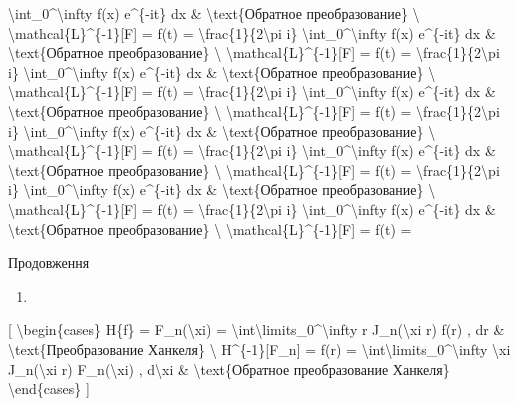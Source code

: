 \documentclass[
]{article}
\providecommand{\tightlist}{%
  \setlength{\itemsep}{0pt}\setlength{\parskip}{0pt}}
\begin{document}
\begin{enumerate}
  \textbackslash int\_0\^{}\textbackslash infty f(x) e\^{}\{-it\} dx \&
  \textbackslash text\{Обратное преобразование\} \textbackslash{}
  \textbackslash mathcal\{L\}\^{}\{-1\}{[}F{]} = f(t) =
  \textbackslash frac\{1\}\{2\textbackslash pi i\}
  \textbackslash int\_0\^{}\textbackslash infty f(x) e\^{}\{-it\} dx \&
  \textbackslash text\{Обратное преобразование\} \textbackslash{}
  \textbackslash mathcal\{L\}\^{}\{-1\}{[}F{]} = f(t) =
  \textbackslash frac\{1\}\{2\textbackslash pi i\}
  \textbackslash int\_0\^{}\textbackslash infty f(x) e\^{}\{-it\} dx \&
  \textbackslash text\{Обратное преобразование\} \textbackslash{}
  \textbackslash mathcal\{L\}\^{}\{-1\}{[}F{]} = f(t) =
  \textbackslash frac\{1\}\{2\textbackslash pi i\}
  \textbackslash int\_0\^{}\textbackslash infty f(x) e\^{}\{-it\} dx \&
  \textbackslash text\{Обратное преобразование\} \textbackslash{}
  \textbackslash mathcal\{L\}\^{}\{-1\}{[}F{]} = f(t) =
  \textbackslash frac\{1\}\{2\textbackslash pi i\}
  \textbackslash int\_0\^{}\textbackslash infty f(x) e\^{}\{-it\} dx \&
  \textbackslash text\{Обратное преобразование\} \textbackslash{}
  \textbackslash mathcal\{L\}\^{}\{-1\}{[}F{]} = f(t) =
  \textbackslash frac\{1\}\{2\textbackslash pi i\}
  \textbackslash int\_0\^{}\textbackslash infty f(x) e\^{}\{-it\} dx \&
  \textbackslash text\{Обратное преобразование\} \textbackslash{}
  \textbackslash mathcal\{L\}\^{}\{-1\}{[}F{]} = f(t) =
  \textbackslash frac\{1\}\{2\textbackslash pi i\}
  \textbackslash int\_0\^{}\textbackslash infty f(x) e\^{}\{-it\} dx \&
  \textbackslash text\{Обратное преобразование\} \textbackslash{}
  \textbackslash mathcal\{L\}\^{}\{-1\}{[}F{]} = f(t) =
  \textbackslash frac\{1\}\{2\textbackslash pi i\}
  \textbackslash int\_0\^{}\textbackslash infty f(x) e\^{}\{-it\} dx \&
  \textbackslash text\{Обратное преобразование\} \textbackslash{}
  \textbackslash mathcal\{L\}\^{}\{-1\}{[}F{]} = f(t) =
\end{enumerate}

Продовження

\begin{enumerate}
\def\labelenumi{\arabic{enumi}.}
\setcounter{enumi}{6}
\tightlist
\item
\end{enumerate}

{[} \textbackslash begin\{cases\} H\{f\} = F\_n(\textbackslash xi) =
\textbackslash int\textbackslash limits\_0\^{}\textbackslash infty r
J\_n(\textbackslash xi r) f(r) , dr \&
\textbackslash text\{Преобразование Ханкеля\} \textbackslash{}
H\^{}\{-1\}{[}F\_n{]} = f(r) =
\textbackslash int\textbackslash limits\_0\^{}\textbackslash infty
\textbackslash xi J\_n(\textbackslash xi r) F\_n(\textbackslash xi) ,
d\textbackslash xi \& \textbackslash text\{Обратное преобразование
Ханкеля\} \textbackslash end\{cases\} {]}
\end{document}
